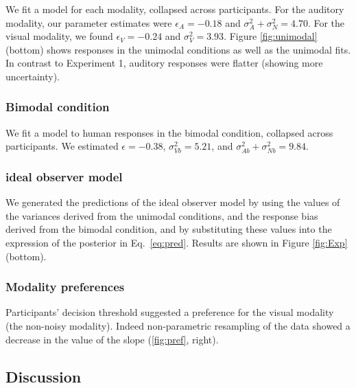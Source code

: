 \documentclass[10pt,letterpaper]{article}
\begin{document}
We fit a model for each modality, collapsed across participants. For the auditory modality, our parameter estimates were $\epsilon_A=-0.18$ and $\sigma^2_A+\sigma^2_N=4.70$. For the visual modality, we found $\epsilon_V=-0.24$ and $\sigma^2_V=3.93$.  Figure \ref{fig:unimodal} (bottom) shows responses in the unimodal conditions as well as the unimodal fits. In contrast to Experiment 1, auditory responses were flatter (showing more uncertainty).

\subsubsection{Bimodal condition}

We fit a model to human responses in the bimodal condition, collapsed across participants. We estimated $\epsilon=-0.38$, $\sigma^2_{Vb}=5.21$, and  $\sigma^2_{Ab}+\sigma^2_{Nb}=9.84$.

\subsubsection{ideal observer model}

We generated the predictions of the ideal observer model by using the values of the variances derived from the unimodal conditions, and the response bias derived from the bimodal condition, and by substituting these values into the expression of the posterior in Eq.~\ref{eq:pred}.
Results are shown in Figure \ref{fig:Exp} (bottom).

\subsubsection{Modality preferences}

Participants' decision threshold suggested a preference for the visual modality (the non-noisy modality). Indeed non-parametric resampling of the data showed a decrease in the value of the slope (\ref{fig:pref}, right).

\subsection{Discussion}
\end{document}
